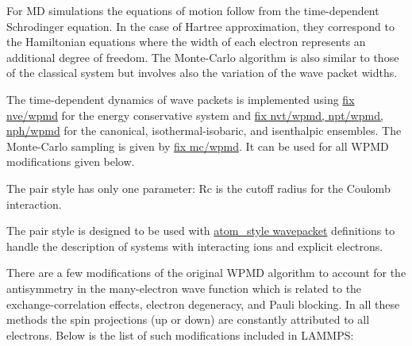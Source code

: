 \documentclass[a4paper,12pt]{article}
\begin{document}
For MD simulations the equations of motion follow from the time-dependent Schrodinger equation. In the case of Hartree approximation, they correspond to the Hamiltonian equations where the width of each electron represents an additional degree of freedom. The Monte-Carlo algorithm is also similar to those of the classical system but involves also the variation of the wave packet widths.

The time-dependent dynamics of wave packets is implemented using \href{fix_nve_wpmd.html}{fix nve/wpmd} for the energy conservative system and  \href{fix_nh_wpmd.html}{fix nvt/wpmd, npt/wpmd, nph/wpmd} for the canonical, isothermal-isobaric, and isenthalpic ensembles. The Monte-Carlo sampling is given by \href{fix_mc_wpmd.html}{fix mc/wpmd}. It can be used for all WPMD modifications given below.

The pair style has only one parameter: Rc is the cutoff radius for the Coulomb interaction.

The pair style is designed to be used with \href{atom_style.html}{atom\_style wavepacket} definitions to handle the description of systems with interacting ions and explicit electrons.

There are a few modifications of the original WPMD algorithm to account for the antisymmetry in the many-electron wave function which is related to the exchange-correlation effects, electron degeneracy, and Pauli blocking. In all these methods the spin projections (up or down) are constantly attributed to all electrons. Below is the list of such modifications included in LAMMPS:
\end{document}
